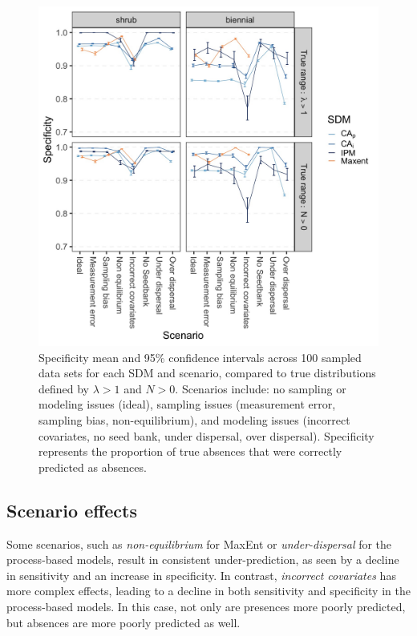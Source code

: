 \documentclass[]{article}
\begin{document}
\newpage
\begin{figure}
    \centering\includegraphics[width=.75\linewidth]{../../figs/Supp_Spec_mn+CI.jpg}
    \caption{\label{fig:SpecificityMed} Specificity mean and 95\% confidence intervals across 100 sampled data sets for each SDM and scenario, compared to true distributions defined by $\lambda > 1$ and $N > 0$. Scenarios include: no sampling or modeling issues (ideal), sampling issues (measurement error, sampling bias, non-equilibrium), and modeling issues (incorrect covariates, no seed bank, under dispersal, over dispersal). Specificity represents the proportion of true absences that were correctly predicted as absences.}
\end{figure}

\newpage
\subsection{Scenario effects}

Some scenarios, such as \emph{non-equilibrium} for MaxEnt or
\emph{under-dispersal} for the process-based models, result in
consistent under-prediction, as seen by a decline in sensitivity and an
increase in specificity. In contrast, \emph{incorrect covariates} has
more complex effects, leading to a decline in both sensitivity and
specificity in the process-based models. In this case, not only are
presences more poorly predicted, but absences are more poorly predicted
as well.
\end{document}
